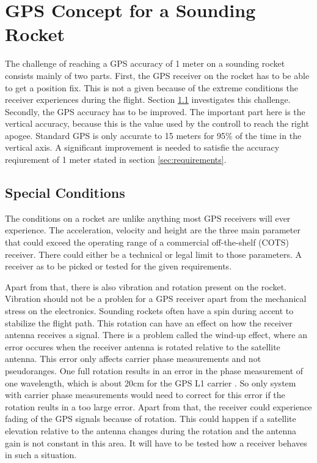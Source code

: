 \chapter{GPS Concept for a Sounding Rocket}

The challenge of reaching a GPS accuracy of 1 meter on a sounding rocket consists mainly of two parts.
First, the GPS receiver on the rocket has to be able to get a position fix.
This is not a given because of the extreme conditions the receiver experiences during the flight.
Section \ref{sec:special_conditions} investigates this challenge.
Secondly, the GPS accuracy has to be improved.
The important part here is the vertical accuracy, because this is the value used by the controll to reach the right apogee.
Standard GPS is only accurate to 15 meters for 95\% of the time in the vertical axis.
A significant improvement is needed to satisfie the accuracy reqiurement of 1 meter stated in section \ref{sec:requirements}.


\section{Special Conditions}\label{sec:special_conditions}

The conditions on a rocket are unlike anything most GPS receivers will ever experience.
The acceleration, velocity and height are the three main parameter that could exceed the operating range of a commercial off-the-shelf (COTS) receiver.
There could either be a technical or legal limit to those parameters.
A receiver as to be picked or tested for the given requirements.

Apart from that, there is also vibration and rotation present on the rocket.
Vibration should not be a problen for a GPS receiver apart from the mechanical stress on the electronics.
Sounding rockets often have a spin during accent to stabilize the flight path.
This rotation can have an effect on how the receiver antenna receives a signal.
There is a problem called the wind-up effect, where an error occures when the receiver antenna is rotated relative to the satellite antenna.
This error only affects carrier phase measurements and not pseudoranges.
One full rotation results in an error in the phase measurement of one wavelength, which is about 20cm for the GPS L1 carrier \cite{Wind_up}. 
So only system with carrier phase measurements would need to correct for this error if the rotation reults in a too large error.
Apart from that, the receiver could experience fading of the GPS signals because of rotation.
This could happen if a satellite elevation relative to the antenna changes during the rotation and the antenna gain is not constant in this area.
It will have to be tested how a receiver behaves in such a situation.

